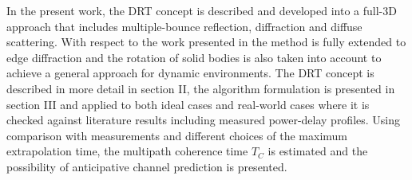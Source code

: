 In the present work, the DRT concept is described and developed into a full-3D approach that includes multiple-bounce reflection, diffraction and diffuse scattering. With respect to the work presented in \cite{qua} the method is fully extended to edge diffraction and the rotation of solid bodies is also taken into account to achieve a general approach for dynamic environments. The DRT concept is described in more detail in section II, the algorithm formulation is presented in section III and applied to both ideal cases and real-world cases where it is checked against literature results including measured power-delay profiles. Using comparison with measurements and different choices of the maximum extrapolation time, the multipath coherence time $T_C$ is estimated and the possibility of anticipative channel prediction is presented. 
